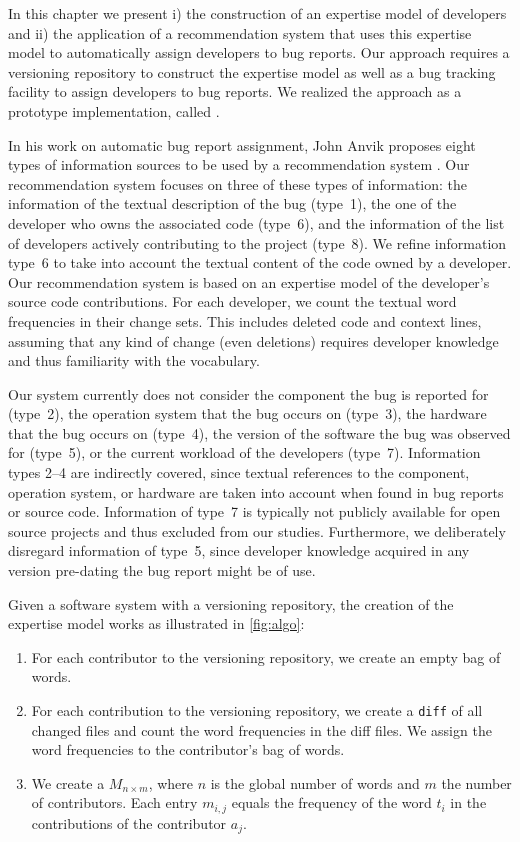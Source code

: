 \documentclass[10pt]{book}
\begin{document}
In this chapter we present i) the construction of an expertise model of developers and ii) the application of a recommendation system that uses this expertise model to automatically assign developers to bug reports. Our approach requires a versioning repository to construct the expertise model as well as a bug tracking facility to assign developers to bug reports. We realized the approach as a prototype implementation, called \DEVLECT.

In his work on automatic bug report assignment, John Anvik proposes eight types of information sources to be used by a recommendation system \cite{Anvi06b}. Our recommendation system focuses on three of these types of information: the information of the textual description of the bug (type~1), the one of the developer who owns the associated code (type~6), and the information of the list of developers actively contributing to the project (type~8). We refine information type~6 to take into account the textual content of the code owned by a developer. Our recommendation system is based on an expertise model of the developer's source code contributions. For each developer, we count the textual word frequencies in their change sets. This includes deleted code and context lines, assuming that any kind of change (even deletions) requires developer knowledge and thus familiarity with the vocabulary. 

Our system currently does not consider the component the bug is reported for (type~2), the operation system that the bug occurs on (type~3), the hardware that the bug occurs on (type~4), the version of the software the bug was observed for (type~5), or the current workload of the developers (type~7). Information types 2--4 are indirectly covered, since textual references to the component, operation system, or hardware are taken into account when found in bug reports or source code. Information of type~7 is typically not publicly available for open source projects and thus excluded from our studies. Furthermore, we deliberately disregard information of type~5, since developer knowledge acquired in any version pre-dating the bug report might be of use. 

Given a software system with a versioning repository, the creation of the expertise model works as illustrated in \autoref{fig:algo}:

\begin{enumerate}
\item For each contributor to the versioning repository, we create an empty bag of words. 
\item For each contribution to the versioning repository, we create a \verb$diff$ of all changed files and count the word frequencies in the diff files. We assign the word frequencies to the contributor's bag of words.
\item We create a \TAM $M_{n \times m}$, where $n$ is the global number of words and $m$ the number of contributors. Each entry $m_{i,j}$ equals the frequency of the word $t_i$ in the contributions of the contributor $a_j$. 
\end{enumerate}
\end{document}
